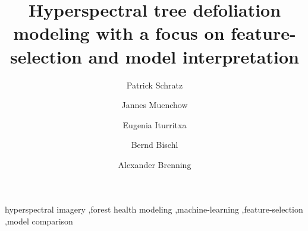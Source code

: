 \documentclass[review]{elsarticle}
\begin{document}
\begin{frontmatter}

	\title{Hyperspectral tree defoliation modeling with a focus on feature-selection and model interpretation}
	\author[FSU]{Patrick Schratz}

	\author[FSU]{Jannes Muenchow}
	\author[NEIKER]{Eugenia Iturritxa}
	\author[LMU]{Bernd Bischl}
	\author[FSU]{Alexander Brenning}

	\address[FSU]{Department of Geography, GIScience group, Grietgasse 6, 07743, Jena, Germany}
	\address[NEIKER]{NEIKER, Granja Modelo –Arkaute, Apdo. 46, 01080 Vitoria-Gasteiz, Arab, Spain}
	\address[LMU]{Department of Statistics, Chair for computational Statistics, Ludwig-Maximilian University Munich, Germany}

	\begin{abstract}

	\end{abstract}

	\begin{keyword}
		hyperspectral imagery \sep forest health modeling \sep machine-learning \sep feature-selection  \sep model comparison
	\end{keyword}

\end{frontmatter}

\linenumbers
\end{document}
